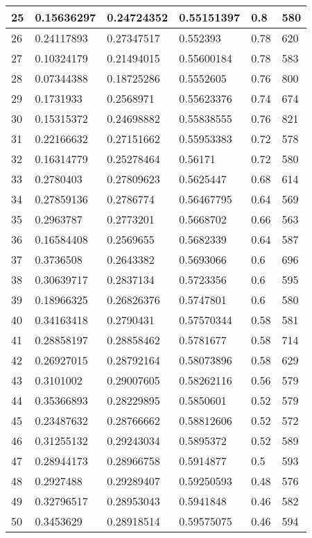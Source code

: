 \begin{longtable}{|l|l|l|l|l|l|}
25 & 0.15636297 & 0.24724352 & 0.55151397 & 0.8 & 580 \\ \hline 
26 & 0.24117893 & 0.27347517 & 0.552393 & 0.78 & 620 \\ \hline 
27 & 0.10324179 & 0.21494015 & 0.55600184 & 0.78 & 583 \\ \hline 
28 & 0.07344388 & 0.18725286 & 0.5552605 & 0.76 & 800 \\ \hline 
29 & 0.1731933 & 0.2568971 & 0.55623376 & 0.74 & 674 \\ \hline 
30 & 0.15315372 & 0.24698882 & 0.55838555 & 0.76 & 821 \\ \hline 
31 & 0.22166632 & 0.27151662 & 0.55953383 & 0.72 & 578 \\ \hline 
32 & 0.16314779 & 0.25278464 & 0.56171 & 0.72 & 580 \\ \hline 
33 & 0.2780403 & 0.27809623 & 0.5625447 & 0.68 & 614 \\ \hline 
34 & 0.27859136 & 0.2786774 & 0.56467795 & 0.64 & 569 \\ \hline 
35 & 0.2963787 & 0.2773201 & 0.5668702 & 0.66 & 563 \\ \hline 
36 & 0.16584408 & 0.2569655 & 0.5682339 & 0.64 & 587 \\ \hline 
37 & 0.3736508 & 0.2643382 & 0.5693066 & 0.6 & 696 \\ \hline 
38 & 0.30639717 & 0.2837134 & 0.5723356 & 0.6 & 595 \\ \hline 
39 & 0.18966325 & 0.26826376 & 0.5747801 & 0.6 & 580 \\ \hline 
40 & 0.34163418 & 0.2790431 & 0.57570344 & 0.58 & 581 \\ \hline 
41 & 0.28858197 & 0.28858462 & 0.5781677 & 0.58 & 714 \\ \hline 
42 & 0.26927015 & 0.28792164 & 0.58073896 & 0.58 & 629 \\ \hline 
43 & 0.3101002 & 0.29007605 & 0.58262116 & 0.56 & 579 \\ \hline 
44 & 0.35366893 & 0.28229895 & 0.5850601 & 0.52 & 579 \\ \hline 
45 & 0.23487632 & 0.28766662 & 0.58812606 & 0.52 & 572 \\ \hline 
46 & 0.31255132 & 0.29243034 & 0.5895372 & 0.52 & 589 \\ \hline 
47 & 0.28944173 & 0.28966758 & 0.5914877 & 0.5 & 593 \\ \hline 
48 & 0.2927488 & 0.29289407 & 0.59250593 & 0.48 & 576 \\ \hline 
49 & 0.32796517 & 0.28953043 & 0.5941848 & 0.46 & 582 \\ \hline 
50 & 0.3453629 & 0.28918514 & 0.59575075 & 0.46 & 594 \\ \hline 
\end{longtable}